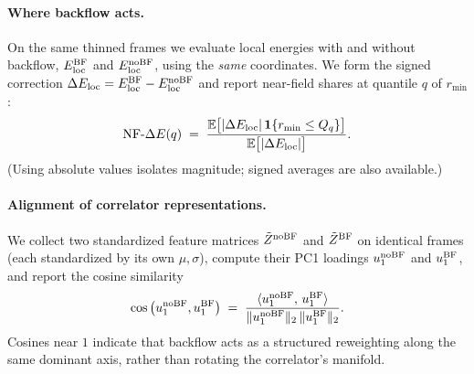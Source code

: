 \paragraph{Where backflow acts.}
On the same thinned frames we evaluate local energies with and without backflow,
$E_{\rm loc}^{\rm BF}$ and $E_{\rm loc}^{\rm noBF}$, using the \emph{same} coordinates.
We form the signed correction $\Delta E_{\rm loc}=E_{\rm loc}^{\rm BF}-E_{\rm loc}^{\rm noBF}$ and report
near-field shares at quantile $q$ of $r_{\min}$:
\[
\mathrm{NF}\text{-}\Delta E(q)\;=\;
\frac{\mathbb{E}\big[|\Delta E_{\rm loc}|\,\mathbf{1}\{r_{\min}\le Q_q\}\big]}
     {\mathbb{E}\big[|\Delta E_{\rm loc}|\big]}.
\]
(Using absolute values isolates magnitude; signed averages are also available.)

\paragraph{Alignment of correlator representations.}
\label{subsec:repr-alignment}
We collect two standardized feature matrices $\tilde Z^{\rm noBF}$ and $\tilde Z^{\rm BF}$
on identical frames (each standardized by its own $\mu,\sigma$), compute their PC1 loadings
$u_1^{\rm noBF}$ and $u_1^{\rm BF}$, and report the cosine similarity
\[
\cos\big(u_1^{\rm noBF},u_1^{\rm BF}\big)\;=\;
\frac{\langle u_1^{\rm noBF},\,u_1^{\rm BF}\rangle}
     {\|u_1^{\rm noBF}\|_2\,\|u_1^{\rm BF}\|_2}.
\]
Cosines near $1$ indicate that backflow acts as a structured reweighting along the same dominant axis,
rather than rotating the correlator’s manifold.

